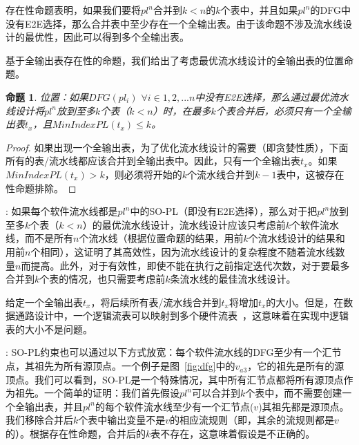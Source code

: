 \documentclass{ctexart}
\newcommand{\para}[1]{\smallskip\noindent {\bf #1}}
\newtheorem{proof}{证明}
\newtheorem{proposition}{命题}
\begin{document}
存在性命题表明，如果我们要将$pl^n$合并到$k < n$的$k$个表中，并且如果$pl^n$的DFG中没有E2E选择，那么合并表中至少存在一个全输出表。由于该命题不涉及流水线设计的最优性，因此可以得到多个全输出表。

基于全输出表存在性的命题，我们给出了考虑最优流水线设计的全输出表的位置命题。

\begin{proposition}
位置：如果$DFG(pl_i)$ $\forall i \in 1, 2, ... n$中没有E2E选择，那么通过最优流水线设计将$pl^n$放到至多$k$个表（$k < n$）时，在最多$k$个表合并后，必须只有一个全输出表$t_x$，且$MinIndexPL(t_x) \leq k$。
\end{proposition}

\begin{proof}
如果出现一个全输出表，为了优化流水线设计的需要（即贪婪性质），下面所有的表/流水线都应该合并到全输出表中。因此，只有一个全输出表$t_x$。如果$MinIndexPL(t_x) > k$，则必须将开始的$k$个流水线合并到$k-1$表中，这被存在性命题排除。
\end{proof}


\para{小结}: 如果每个软件流水线都是$pl^n$中的SO-PL（即没有E2E选择），那么对于把$pl^n$放到至多$k$个表（$k < n$）的最优流水线设计，流水线设计应该只考虑前$k$个软件流水线，而不是所有$n$个流水线（根据位置命题的结果，用前$k$个流水线设计的结果和用前$n$个相同），这证明了其高效性，因为流水线设计的复杂程度不随着流水线数量$n$而提高。此外，对于有效性，即使不能在执行之前指定迭代次数，对于要最多合并到$k$个表的情况，也只需要考虑前$k$条流水线的最佳流水线设计。 

给定一个全输出表$t_x$，将后续所有表/流水线合并到$t_x$将增加$t_x$的大小。但是，在数据通路设计中，一个逻辑流表可以映射到多个硬件流表~\cite{bosshart2013forwarding}，这意味着在实现中逻辑表的大小不是问题。

\para{放宽约束}: SO-PL约束也可以通过以下方式放宽：每个软件流水线的DFG至少有一个汇节点，其祖先为所有源顶点。一个例子是图~\ref{fig:dfg}中的$v_{a3}$，它的祖先是所有的源顶点。我们可以看到，SO-PL是一个特殊情况，其中所有汇节点都将所有源顶点作为祖先。一个简单的证明：我们首先假设$pl^n$可以合并到$k$个表中，而不需要创建一个全输出表，并且$pl^n$的每个软件流水线至少有一个汇节点($v$)其祖先都是源顶点。我们移除合并后$k$个表中输出变量不是$v$的相应流规则（即，其余的流规则都是$v$的）。根据存在性命题，合并后的$k$表不存在，这意味着假设是不正确的。
\end{document}
